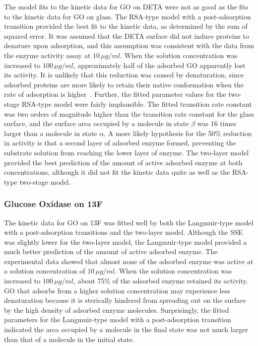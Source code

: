 The model fits to the kinetic data for GO on DETA were not as good
as the fits to the kinetic data for GO on glass. The RSA-type model
with a post-adsorption transition provided the best fit to the kinetic
data, as determined by the sum of squared error. It was assumed that
the DETA surface did not induce proteins to denature upon adsorption,
and this assumption was consistent with the data from the enzyme activity
assay at $10\,\mu g/ml$. When the solution concentration was increased
to $100\,\mu g/ml$, approximately half of the adsorbed GO apparently
lost its activity. It is unlikely that this reduction was caused by
denaturation, since adsorbed proteins are more likely to retain their
native conformation when the rate of adsorption is higher~\cite{Latour2005}.
Further, the fitted parameter values for the two-stage RSA-type model
were fairly implausible. The fitted transition rate constant was two
orders of magnitude higher than the transition rate constant for the
glass surface, and the surface area occupied by a molecule in state
$\beta$ was 16 times larger than a molecule in state $\alpha$. A
more likely hypothesis for the 50\% reduction in activity is that
a second layer of adsorbed enzyme formed, preventing the substrate
solution from reaching the lower layer of enzyme. The two-layer model
provided the best prediction of the amount of active adsorbed enzyme
at both concentrations, although it did not fit the kinetic data quite
as well as the RSA-type two-stage model. 


\subsubsection{Glucose Oxidase on 13F}

The kinetic data for GO on 13F was fitted well by both the Langmuir-type
model with a post-adsorption transitions and the two-layer model.
Although the SSE was slightly lower for the two-layer model, the Langmuir-type
model provided a much better prediction of the amount of active adsorbed
enzyme. The experimental data showed that almost none of the adsorbed
enzyme was active at a solution concentration of $10\,\mu g/ml$.
When the solution concentration was increased to $100\,\mu g/ml$,
about 75\% of the adsorbed enzyme retained its activity. GO that adsorbs
from a higher solution concentration may experience less denaturation
because it is sterically hindered from spreading out on the surface
by the high density of adsorbed enzyme molecules. Surprisingly, the
fitted parameters for the Langmuir-type model with a post-adsorption
transition indicated the area occupied by a molecule in the final
state was not much larger than that of a molecule in the initial state.


